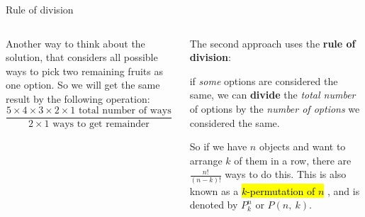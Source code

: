 \documentclass[9pt,aspectratio=169]{beamer}
\begin{document}
\begin{frame}{Rule of division}
\begin{columns}[T]
\begin{column}{0.5\textwidth}
      Another way to think about the solution, that considers all possible ways to pick two remaining fruits as one option. So we will get the same result by the following operation:
      \[
        \frac{5 \times 4 \times 3 \times 2 \times 1 \text{\ total number of ways}}{2 \times 1 \text{\  ways to get remainder}} = \frac{5!}{2!} = 60.
      \]
    \end{column}
    \begin{column}{0.5\textwidth}
      The second approach uses the \textbf{rule of division}:
      \begin{definition}
        if \emph{some} options are considered the same, we can \textbf{divide} the \emph{total number} of options by the \emph{number of options} we considered the same.
      \end{definition}

      So if we have $n$ objects and want to arrange $k$ of them in a row, there are $\frac{n!}{(n-k)!}$ ways to do this. This is also known as a \hl{ $k$-permutation of $n$ }, and is denoted by $P_k^n$ or $P(n,\ k)$.\medskip


\end{column}
\end{columns}
\end{frame}
\end{document}
